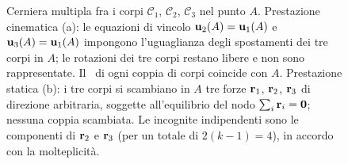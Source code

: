 \begin{figure}[htbp]
	\caption[Cerniera multipla  fra tre corpi]{%
		Cerniera multipla  fra i corpi $\mathcal{C}_1$,
		$\mathcal{C}_2$, $\mathcal{C}_3$ nel punto $A$.
		Prestazione cinematica (a):  le equazioni di vincolo
		$\mathbf{u}_2(A) = \mathbf{u}_1(A)$ e $\mathbf{u}_3(A) = \mathbf{u}_1(A)$ impongono
		l'uguaglianza degli spostamenti dei tre corpi in $A$;
		le rotazioni dei tre corpi restano libere e non sono
		rappresentate. Il \CRr\ di ogni coppia di corpi coincide
		con $A$. Prestazione statica (b): i tre corpi si scambiano in $A$ tre forze
		$\mathbf{r}_1$, $\mathbf{r}_2$, $\mathbf{r}_3$ di direzione arbitraria,
		soggette all'equilibrio del nodo $\sum_i \mathbf{r}_i = \mathbf{0}$;
		nessuna coppia scambiata. Le incognite indipendenti
		sono le componenti di $\mathbf{r}_2$ e $\mathbf{r}_3$ (per un totale
		di $2(k-1) = 4$), in accordo con la molteplicità.}
	\label{fig:cerniera_tripla}
\end{figure}
